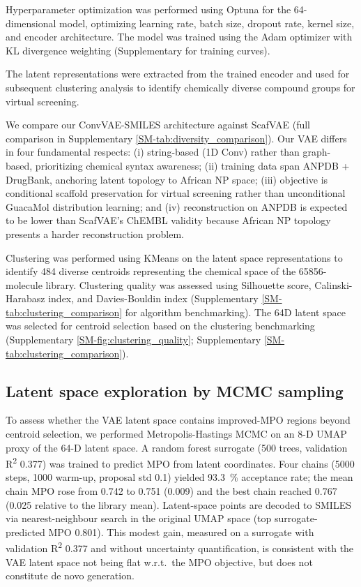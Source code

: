 \documentclass[journal=jcisd8,manuscript=article]{achemso}
\begin{document}
Hyperparameter optimization was performed using Optuna \cite{Akiba2019} for the \num{64}-dimensional model, optimizing learning rate, batch size, dropout rate,
kernel size, and encoder architecture. The model was trained using the Adam optimizer with KL divergence weighting (Supplementary
 for training curves).

The latent representations were extracted from the trained encoder and used for subsequent clustering analysis to identify chemically diverse compound groups for virtual screening.

We compare our ConvVAE-SMILES architecture against ScafVAE \cite{tiejundong2023scafvae} (full comparison in Supplementary \cref{SM-tab:diversity_comparison}).
Our VAE differs in four fundamental respects: (i) string-based (1D Conv) rather than graph-based, prioritizing chemical syntax awareness; (ii) training data
span ANPDB + DrugBank, anchoring latent topology to African NP space; (iii) objective is conditional scaffold preservation for virtual screening rather than
unconditional GuacaMol distribution learning; and (iv) reconstruction on ANPDB is expected to be lower than ScafVAE's ChEMBL validity because African NP
topology presents a harder reconstruction problem.

Clustering was performed using KMeans on the latent space representations to identify \num{484} diverse centroids representing the chemical space of the
\num{65856}-molecule library. Clustering quality was assessed using Silhouette score, Calinski-Harabasz index, and Davies-Bouldin index (Supplementary
\cref{SM-tab:clustering_comparison} for algorithm benchmarking). The 64D latent space was selected for centroid selection based on the clustering benchmarking
(Supplementary \cref{SM-fig:clustering_quality}; Supplementary \cref{SM-tab:clustering_comparison}).

\subsection{Latent space exploration by MCMC sampling}

To assess whether the VAE latent space contains improved-MPO regions beyond centroid selection, we performed Metropolis-Hastings MCMC on an \num{8}-D UMAP
proxy of the \num{64}-D latent space. A random forest surrogate (\num{500} trees, validation R\textsuperscript{2} \num{0.377}) was trained to predict MPO from
latent coordinates. Four chains (\num{5000} steps, \num{1000} warm-up, proposal std \num{0.1}) yielded \qty{93.3}{\percent} acceptance rate; the mean chain MPO
rose from \num{0.742} to \num{0.751} (\num{+0.009}) and the best chain reached \num{0.767} (\num{+0.025} relative to the library mean). Latent-space points are
decoded to SMILES via nearest-neighbour search in the original UMAP space (top surrogate-predicted MPO \num{0.801}). This modest gain, measured on a surrogate
with validation R\textsuperscript{2} \num{0.377} and without uncertainty quantification, is consistent with the VAE latent space not being flat w.r.t.\ the MPO
objective, but does not constitute de novo generation.
\end{document}
